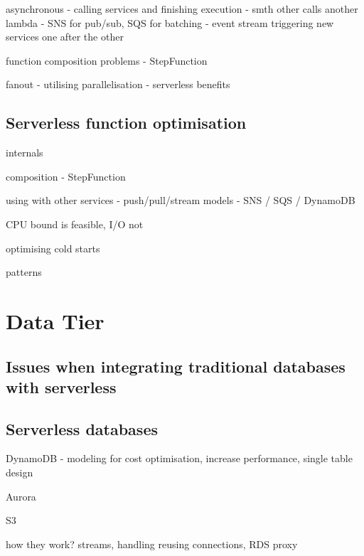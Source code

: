 asynchronous - calling services and finishing execution - smth other calls another lambda - SNS for pub/sub, SQS for batching - event stream triggering new services one after the other

function composition problems - StepFunction

fanout - utilising parallelisation - serverless benefits


\subsection{Serverless function optimisation}

internals

composition - StepFunction

using with other services - push/pull/stream models - SNS / SQS / DynamoDB

CPU bound is feasible, I/O not

optimising cold starts

patterns

\section{Data Tier}

\subsection{Issues when integrating traditional databases with serverless}

\subsection{Serverless databases}

DynamoDB - modeling for cost optimisation, increase performance, single table design

Aurora

S3

how they work? streams, handling reusing connections, RDS proxy

